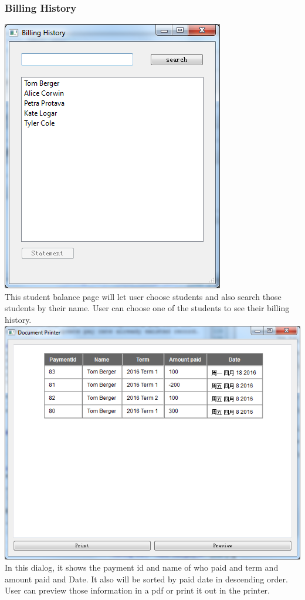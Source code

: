 \subsubsection{Billing History}
\includegraphics[scale=0.5]{pics/billing_main.png}\\
This student balance page will let user choose students and also search those students by their name. User can choose one of the students to see their billing history.\\
\includegraphics[scale=0.5]{pics/billing_dialog.png}\\
In this dialog, it shows the payment id and name of who paid and term and amount paid and Date. It also will be sorted by paid date in descending order. User can preview those information in a pdf or print it out in the printer.\\

